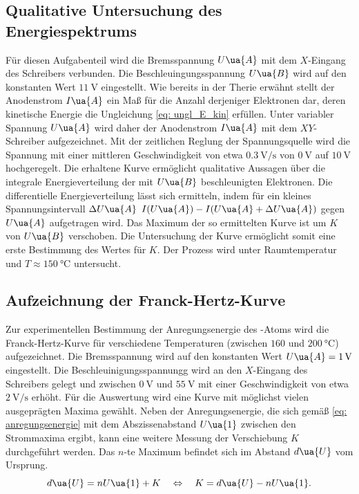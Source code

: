 \subsection{Qualitative Untersuchung des Energiespektrums}
Für diesen Aufgabenteil wird die Bremsspannung $U\ua{A}$ mit dem $X$-Eingang des Schreibers verbunden. Die
Beschleuingungsspannung $U\ua{B}$ wird auf den konstanten Wert $\SI{11}{\volt}$ eingestellt.
Wie bereits
in der Therie erwähnt stellt der Anodenstrom $I\ua{A}$ ein Maß für die Anzahl derjeniger Elektronen dar, deren %
kinetische Energie die Ungleichung \eqref{eq: ungl_E_kin} erfüllen.
Unter variabler Spannung $U\ua{A}$ wird daher der Anodenstrom $I\ua{A}$ mit dem $XY$-Schreiber aufgezeichnet.
Mit der zeitlichen Reglung der Spannungsquelle wird die Spannung mit einer mittleren Geschwindigkeit von etwa
$\SI{0.3}{\volt \per\second}$ von $\SI{0}{\volt}$ auf $\SI{10}{\volt}$ hochgeregelt. Die erhaltene Kurve ermöglicht
qualitative Aussagen über die integrale Energieverteilung der mit $U\ua{B}$ beschleunigten Elektronen.
Die differentielle Energieverteilung lässt sich ermitteln, indem für ein kleines Spannungsintervall
$\Delta U\ua{A}$ $I(U\ua{A}) - I(U\ua{A} + \Delta U\ua{A})$ gegen $U\ua{A}$ aufgetragen wird. Das Maximum
der so ermittelten Kurve ist um $K$ von $U\ua{B}$ verschoben. Die Untersuchung der Kurve ermöglicht somit eine
erste Bestimmung des Wertes für $K$.
Der Prozess wird unter Raumtemperatur und $T \approx \SI{150}{\celsius}$ untersucht.

\subsection{Aufzeichnung der Franck-Hertz-Kurve}
Zur experimentellen Bestimmung der Anregungsenergie des -Atoms wird die Franck-Hertz-Kurve für
verschiedene Temperaturen (zwischen $\num{160}$ und $\SI{200}{\celsius}$) aufgezeichnet.
Die Bremsspannung wird auf den konstanten Wert $U\ua{A} = \SI{1}{\volt}$ eingestellt.
Die Beschleuinigungsspannungg wird an den $X$-Eingang des Schreibers gelegt und zwischen $\SI{0}{\volt}$
und $\SI{55}{\volt}$ mit einer Geschwindigkeit von etwa $\SI{2}{\volt \per\second}$ erhöht. Für die
Auswertung wird eine Kurve mit möglichst vielen ausgeprägten Maxima gewählt. Neben der Anregungsenergie,
die sich gemäß \ref{eq: anregungsenergie} mit dem Abszissenabstand $U\ua{1}$ zwischen den Strommaxima ergibt,
kann eine weitere Messung der Verschiebung
$K$ durchgeführt werden. Das $n$-te Maximum befindet sich im Abstand $d\ua{U}$ vom Ursprung.
\begin{equation}
  d\ua{U} = nU\ua{1} + K \quad \Leftrightarrow \quad K = d\ua{U}- n U\ua{1}.
  \label{eq: k_franck}
\end{equation}


